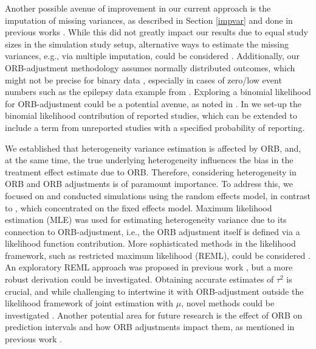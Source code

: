 \documentclass[twocolumn]{article}\usepackage[]{graphicx}\usepackage[]{xcolor}
\providecommand{\DIFaddend}{} %
\DeclareRobustCommand{\DIFaddend}{\DIFOaddend \let\includegraphics\DIFOincludegraphics} %
\begin{document}
\DIFaddend Another possible avenue of improvement in our current approach is the imputation of missing variances, as described in Section \ref{impvar} and done in previous works \citep{Copas2014, Copas2019, Bay, mythesis}. While this did not greatly impact our results due to equal study sizes in the simulation study setup, alternative ways to estimate the missing variances, e.g., via multiple imputation, could be considered \citep{var_imp, var_imp2}. Additionally, our ORB-adjustment methodology assumes normally distributed outcomes, which might not be precise for binary data \citep{Copas2014, Copas2019}, especially in cases of zero/low event numbers such as the epilepsy data example from \citet{Copas2019}. Exploring a binomial likelihood for ORB-adjustment could be a potential avenue, as noted in \citet{mythesis}. In \citet{mythesis} we set-up the binomial likelihood contribution of reported studies, which can be extended to include a term from unreported studies with a specified probability of reporting.

We established that heterogeneity variance estimation is affected by ORB, and, at the same time, the true underlying heterogeneity influences the bias in the treatment effect estimate due to ORB. Therefore, considering heterogeneity in ORB and ORB adjustments is of paramount importance. To address this, we focused on and conducted simulations using the random effects model, in contrast to \citet{Copas2019}, which concentrated on the fixed effects model. Maximum likelihood estimation (MLE) was used for estimating heterogeneity variance due to its connection to ORB-adjustment, i.e.,  the ORB adjustment itself is defined via a likelihood function contribution. More sophisticated methods in the likelihood framework, such as restricted maximum likelihood (REML), could be considered \citep{REML, tauCI, REML2, mythesis}. An exploratory REML approach was proposed in previous work \citep{mythesis}, but a more robust derivation could be investigated. Obtaining accurate estimates of $\tau^2$ is crucial, and while challenging to intertwine it with ORB-adjustment outside the likelihood framework of joint estimation with $\mu$, novel methods could be investigated \citep{tauCI, REML, REML2}. Another potential area for future research is the effect of ORB on prediction intervals \citep{PI_coverage} and how ORB adjustments impact them, as mentioned in previous work \citep{mythesis}.
\end{document}
